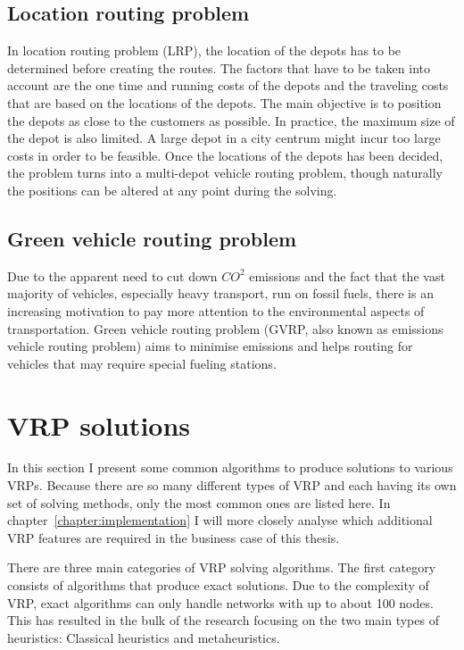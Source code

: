 \subsection{Location routing problem}

In location routing problem (LRP), the location of the depots has to be determined before creating the routes. The factors that have to be taken into account are the one time and running costs of the depots and the traveling costs that are based on the locations of the depots. The main objective is to position the depots as close to the customers as possible. In practice, the maximum size of the depot is also limited. A large depot in a city centrum might incur too large costs in order to be feasible. Once the locations of the depots has been decided, the problem turns into a multi-depot vehicle routing problem, though naturally the positions can be altered at any point during the solving. \cite{tuzun1999two}


\subsection{Green vehicle routing problem}

Due to the apparent need to cut down $CO^2$ emissions and the fact that the vast majority of vehicles, especially heavy transport, run on fossil fuels, there is an increasing motivation to pay more attention to the environmental aspects of transportation. Green vehicle routing problem (GVRP, also known as emissions vehicle routing problem) aims to minimise emissions and helps routing for vehicles that may require special fueling stations. \cite{erdougan2012green}



\section{VRP solutions}

In this section I present some common algorithms to produce solutions to various VRPs. Because there are so many different types of VRP and each having its own set of solving methods, only the most common ones are listed here. In chapter~\ref{chapter:implementation} I will more closely analyse which additional VRP features are required in the business case of this thesis. 

There are three main categories of VRP solving algorithms. The first category consists of algorithms that produce exact solutions. Due to the complexity of VRP, exact algorithms can only handle networks with up to about 100 nodes. This has resulted in the bulk of the research focusing on the two main types of heuristics: Classical heuristics and metaheuristics. \cite{laporte2007you}  

